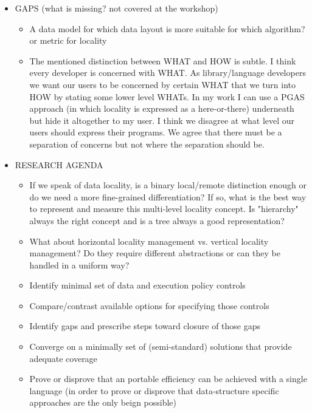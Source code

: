 \begin{itemize}
\begin{itemize}
\item GAPS (what is missing? not covered at the workshop)
  \begin{itemize}
  \item A data model for which data layout is more suitable for which algorithm? or metric for locality
  \item The mentioned distinction between WHAT and HOW is subtle. I think every developer is concerned with WHAT. As library/language developers we want our users to be concerned by certain WHAT that we turn into HOW by stating some lower level WHATs. In my work I can use a PGAS approach (in which locality is expressed as a here-or-there) underneath but hide it altogether to my user. I think we disagree at what level our users should express their programs. We agree that there must be a separation of concerns but not where the separation should be.
  \end{itemize}

\item RESEARCH AGENDA
  \begin{itemize}
\item If we speak of data locality, is a binary local/remote distinction enough or do we need a more fine-grained differentiation? If so, what is the best way to represent and measure this multi-level locality concept. Is "hierarchy" always the right concept and is a tree always a good representation?

\item What about horizontal locality management vs. vertical locality management? Do they require different abstractions or can they be handled in a uniform way?

  \item Identify minimal set of data and execution policy controls
  \item Compare/contrast available options for specifying those controls
  \item Identify gaps and prescribe steps toward closure of those gaps
  \item Converge on a minimally set of (semi-standard) solutions that provide adequate coverage
  \item Prove or disprove that an portable efficiency can be achieved with a single language (in order to prove or disprove that data-structure specific approaches are the only beign possible)
  \end{itemize}

\end{itemize}
\end{itemize}


